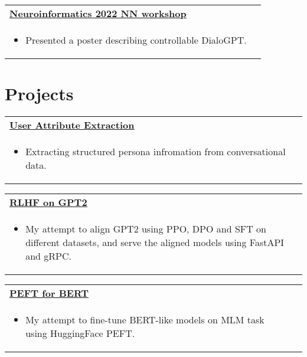 \documentclass[a4paper,8pt]{article}
\begin{document}
\begin{tabularx}{\linewidth}{ @{}l r@{} }
\color[HTML]{1C033C} \textbf{\uline{\href{https://github.com/mumtozee/Documents/blob/main/rnns_dialogpt.pdf}{Neuroinformatics 2022 NN workshop}}}\\[5pt]
\begin{minipage}[t]{\linewidth}
    \begin{itemize}[nosep,after=\strut, leftmargin=2em, itemsep=2pt]
        \item Presented a poster describing controllable DialoGPT.
    \end{itemize}
    \end{minipage}
\end{tabularx}

\section{Projects}

\begin{tabularx}{\linewidth}{ @{}l r@{} }
\color[HTML]{1C033C} \textbf{\uline{\href{https://github.com/mumtozee/UserFeatureExtraction}{User Attribute Extraction}}}\\[5pt]
\begin{minipage}[t]{\linewidth}
    \begin{itemize}[nosep,after=\strut, leftmargin=2em, itemsep=2pt]
        \item Extracting structured persona infromation from conversational data.
    \end{itemize}
    \end{minipage}
\end{tabularx}

\begin{tabularx}{\linewidth}{ @{}l r@{} }
\color[HTML]{1C033C} \textbf{\uline{\href{https://github.com/mumtozee/RLHFforGPT2}{RLHF on GPT2}}}\\[5pt]
\begin{minipage}[t]{\linewidth}
    \begin{itemize}[nosep,after=\strut, leftmargin=2em, itemsep=2pt]
        \item My attempt to align GPT2 using PPO, DPO and SFT on different datasets, and serve the aligned models using FastAPI and gRPC.
    \end{itemize}
    \end{minipage}
\end{tabularx}

\begin{tabularx}{\linewidth}{ @{}l r@{} }
\color[HTML]{1C033C} \textbf{\uline{\href{https://github.com/mumtozee/PEFTforBERT}{PEFT for BERT}}}\\[5pt]
\begin{minipage}[t]{\linewidth}
    \begin{itemize}[nosep,after=\strut, leftmargin=2em, itemsep=2pt]
        \item My attempt to fine-tune BERT-like models on MLM task using HuggingFace PEFT.
    \end{itemize}
    \end{minipage}
\end{tabularx}
\end{document}
